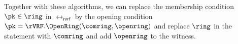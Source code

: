 Together with these algorithms, we can replace the membership condition $\pk \in \ring$ in $  \rel_{\mathsf{rvrf}} $ by the opening condition
$ \pk = \rVRF.\OpenRing(\comring,\openring) $ and replace $ \ring $ in the statement with $ \comring $ and add $ \openring $ to the witness.
%
%
%
%
%
%
